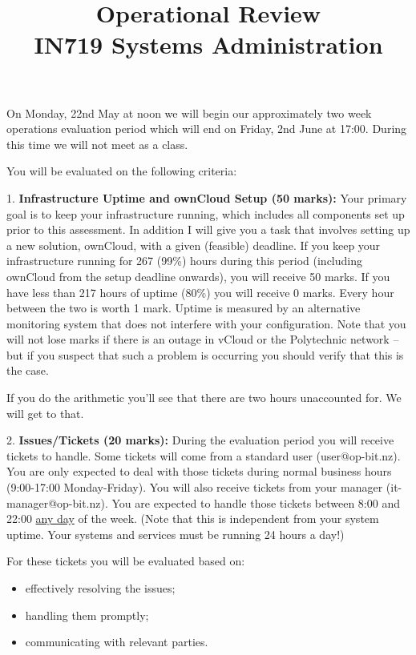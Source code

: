 \documentclass{article}   	%
\title{Operational Review\\ IN719 Systems Administration}
\date{}							%
\begin{document}
\maketitle


On Monday, 22nd May at noon we will begin our approximately two week operations evaluation period which will end on Friday, 2nd June at 17:00.  During this time we will not meet as a class.

You will be evaluated on the following criteria:

\vspace{0.5cm}

1.  \textbf{Infrastructure Uptime and ownCloud Setup (50 marks):}  Your primary goal is to keep your infrastructure running, which includes all components set up prior to this assessment. In addition I will give you a task that involves setting up a new solution, ownCloud, with a given (feasible) deadline.  If you keep your infrastructure running for 267 (99\%) hours during this period (including ownCloud from the setup deadline onwards), you will receive 50 marks.  If you have less than 217 hours of uptime (80\%) you will receive 0 marks.  Every hour between the two is worth 1 mark.  Uptime is measured by an alternative monitoring system that does not interfere with your configuration.  Note that you will not lose marks if there is an outage in vCloud or the Polytechnic network -- but if you suspect that such a problem is occurring you should verify that this is the case.

If you do the arithmetic you'll see that there are two hours unaccounted for.  We will get to that.

\vspace{0.5cm}

2.  \textbf{Issues/Tickets (20 marks):}  During the evaluation period you will receive tickets to handle.  Some tickets will come from a standard user (user@op-bit.nz).  You are only expected to deal with those tickets during normal business hours (9:00-17:00 Monday-Friday).  You will also receive tickets from your manager (it-manager@op-bit.nz).  You are expected to handle those tickets between 8:00 and 22:00 \underline{any day} of the week. (Note that this is independent from your system uptime. Your systems and services must be running 24 hours a day!) 

For these tickets you will be evaluated based on:

\begin{itemize}
\item effectively resolving the issues;
\item handling them promptly;
\item communicating with relevant parties.
\end{itemize}
\end{document}
